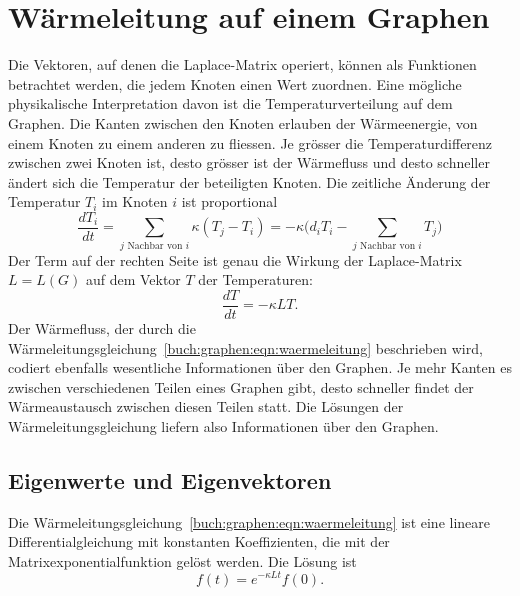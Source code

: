 %
%
%
\section{Wärmeleitung auf einem Graphen
\label{buch:section:waermeleitung-auf-einem-graphen}}
Die Vektoren, auf denen die Laplace-Matrix operiert, können
als Funktionen betrachtet werden, die jedem Knoten einen Wert zuordnen.
Eine mögliche physikalische Interpretation davon ist die Temperaturverteilung
auf dem Graphen.
%
Die Kanten zwischen den Knoten erlauben der Wärmeenergie, von einem Knoten
zu einem anderen zu fliessen.
Je grösser die Temperaturdifferenz zwischen zwei Knoten ist, desto
grösser ist der Wärmefluss und desto schneller ändert sich die Temperatur
der beteiligten Knoten.
Die zeitliche Änderung der Temperatur $T_i$ im Knoten $i$ ist proportional
\[
\frac{dT_i}{dt}
=
\sum_{\text{$j$ Nachbar von $i$}} \kappa (T_j-T_i)
=
-
\kappa
\biggl(
d_iT_i
-
\sum_{\text{$j$ Nachbar von $i$}} T_j
\biggr)
\]
Der Term auf der rechten Seite ist genau die Wirkung der 
Laplace-Matrix $L=L(G)$ auf dem Vektor $T$ der Temperaturen:
\begin{equation}
\frac{dT}{dt}
=
-\kappa L T.
\label{buch:graphen:eqn:waermeleitung}
\end{equation}
Der Wärmefluss, der durch die
Wärmeleitungsgleichung~\eqref{buch:graphen:eqn:waermeleitung} beschrieben
%
wird, codiert ebenfalls wesentliche Informationen über den Graphen.
Je mehr Kanten es zwischen verschiedenen Teilen eines Graphen gibt,
desto schneller findet der Wärmeaustausch zwischen diesen Teilen
statt.
Die Lösungen der Wärmeleitungsgleichung liefern also Informationen 
über den Graphen.

\subsection{Eigenwerte und Eigenvektoren
\label{buch:subsection:ein-zyklischer-graph}}
Die Wärmeleitungsgleichung~\eqref{buch:graphen:eqn:waermeleitung} 
ist eine lineare Differentialgleichung mit konstanten Koeffizienten,
die mit der Matrixexponentialfunktion gelöst werden.
%
Die Lösung ist
\[
f(t) = e^{-\kappa Lt}f(0).
\]

